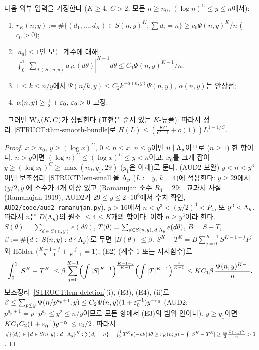 \begin{theorem}\label{STRUCT:thm-smooth-to-Lam}
다음 외부 입력을 가정한다 ($K\ge4$, $C>2$; 모든 $n\ge n_0$, $(\log n)^C\le y\le n$에서):
\begin{enumerate}[label=(E\arabic*)]
\item $r_K(n;y):=\#\{(d_1,\dots,d_K)\in S(n,y)^K:\sum d_i=n\}\ge c_0\Psi(n,y)^K/n$ ($c_0>0$);
\item $|a_d|\le1$인 모든 계수에 대해 $\int_0^1|\sum_{d\in S(n,y)}a_de(d\theta)|^{K-1}d\theta\le C_1\Psi(n,y)^{K-1}/n$;
\item $1\le k\le n/y$에서 $\Psi(n/k,y)\le C_2k^{-\alpha(n,y)}\Psi(n,y)$, $\alpha(n,y)$는 안장점;
\item $\alpha(n,y)\ge\frac12+\varepsilon_0$, $\varepsilon_0>0$ 고정.
\end{enumerate}
\ 그러면 $\mathrm W_\Lambda(K,C)$가 성립한다 (표현은 순서 있는 $K$-튜플). 따라서 정리~\ref{STRUCT:thm-smooth-bundle}로 $H(L)\le(\frac{KC}{C-1}+o(1))L^{1-1/C}$.
\end{theorem}
\begin{proof}
$x\ge x_0$, $y\ge(\log x)^C$, $0\le n\le x$. $n\le y$이면 $n\mid\Lambda_y$이므로 ($n\ge1$) 한 항이다. $n>y$이면 $(\log n)^C\le(\log x)^C\le y<n$이고, $x_0$를 크게 잡아 $y\ge(\log x_0)^C\ge\max(n_0,y_1,29)$ ($y_1$은 아래)로 둔다.
(AUD2 보완) $y<n<y^3$이면 보조정리~\ref{STRUCT:lem-small}을 $\Lambda_y$ ($L:=y$, $k=4$)에 적용한다: $y\ge29$에서 $(y/2,y]$에 소수가 4개 이상 있고 (Ramanujan 소수 $R_4=29$: \EXT\ 교과서 사실 (Ramanujan 1919), AUD2가 $29\le y\le2\cdot10^6$에서 수치 확인, \texttt{AUD2/code/aud2\_ramanujan.py}), $y>16$에서 $n<y^3<(y/2)^4<P_4$, 또 $y^3<\Lambda_y$. 따라서 $n$은 $D(\Lambda_y)$의 원소 $\le4\le K$개의 합이다. 이하 $n\ge y^3$이라 한다.
$S(\theta)=\sum_{d\in S(n,y)}e(d\theta)$, $T(\theta)=\sum_{d\in S(n,y),\,d\mid\Lambda_y}e(d\theta)$, $B=S-T$, $\beta:=\#\{d\in S(n,y):d\nmid\Lambda_y\}$로 두면 $|B(\theta)|\le\beta$. $S^K-T^K=B\sum_{j=0}^{K-1}S^{K-1-j}T^j$와 Hölder ($\frac{K-1-j}{K-1}+\frac j{K-1}=1$), (E2) (계수 $1$ 또는 지시함수)로
\[
\int_0^1|S^K-T^K|\le\beta\sum_{j=0}^{K-1}\Bigl(\int|S|^{K-1}\Bigr)^{\frac{K-1-j}{K-1}}\Bigl(\int|T|^{K-1}\Bigr)^{\frac{j}{K-1}}\le KC_1\beta\,\frac{\Psi(n,y)^{K-1}}{n}.
\]
보조정리~\ref{STRUCT:lem-deletion}(i), (E3), (E4), (ii)로 $\beta\le\sum_{p\le y}\Psi(n/p^{a_p+1},y)\le C_2\Psi(n,y)(1+\varepsilon_0^{-1})y^{-\varepsilon_0}$ (AUD2: $p^{a_p+1}=p\cdot p^{a_p}\le y^2\le n/y$이므로 모든 항에서 (E3)의 범위 안이다).
$y\ge y_1$이면 $KC_1C_2(1+\varepsilon_0^{-1})y^{-\varepsilon_0}\le c_0/2$. 따라서
$\#\{(d_i)\in\{d\in S(n,y): d\mid\Lambda_y\}^K:\sum d_i=n\}=\int_0^1T^Ke(-n\theta)d\theta\ge r_K(n;y)-\int|S^K-T^K|\ge\frac{c_0}2\frac{\Psi(n,y)^K}{n}>0$.
\end{proof}

